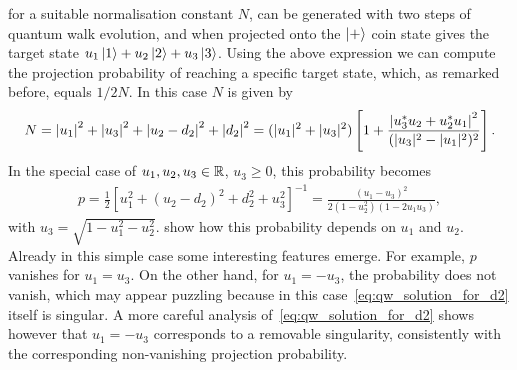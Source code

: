 for a suitable normalisation constant $N$,
can be generated with two steps of quantum walk evolution, and when projected onto the $\ket+$ coin state gives the target state $u_1\ket1+u_2\ket2+u_3\ket3$.
Using the above expression we can compute the projection probability of reaching a specific target state, which, as remarked before, equals $1/2N$.
In this case $N$ is given by
\begin{equation}
\begin{aligned}
    N =
    \abs{u_1}^2 +\abs{u_3}^2 + \abs{u_2-d_2}^2 + \abs{d_2}^2 =
    (\lvert u_1\rvert^2 +\lvert u_3\rvert^2)\left[
        1 +
        \frac{
            \abs{u_3^* u_2 + u_2^* u_1}^2
        }{(\lvert u_3\rvert^2-\lvert u_1\rvert^2)^2}
\right].
\end{aligned}
\end{equation}
In the special case of $u_1, u_2, u_3 \in \mathbb{R}$, $u_3 \ge 0$, this probability becomes
\begin{equation}
\begin{aligned}
	p = \frac{1}{2} \left[ u_1^2 + (u_2 - d_2)^2 + d_2^2 + u_3^2 \right]^{-1}
	= \frac{
		\left( u_1 - u_3 \right)^2
	}{
		2(1 - u_2^2)(1 - 2 u_1 u_3)
	},
\end{aligned}
\label{eq:proj_prob_2steps}
\end{equation}
with $u_3 = \sqrt{1 - u_1^2 - u_2^2}$.
 show how this probability depends on $u_1$ and $u_2$.
Already in this simple case some interesting features emerge. For example, $p$ vanishes for $u_1 = u_3$.
On the other hand, for $u_1 = -u_3$, the probability does not vanish, which may appear puzzling because in this case~\cref{eq:qw_solution_for_d2} itself is singular.
A more careful analysis of~\cref{eq:qw_solution_for_d2} shows however that $u_1 = -u_3$ corresponds to a removable singularity, consistently with the corresponding non-vanishing projection probability.


